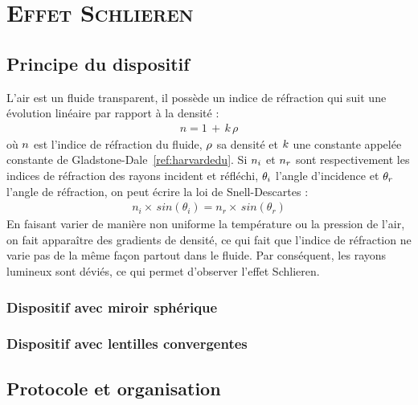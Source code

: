 \renewcommand{\chaptername}{\scshape Partie}
\chapter{\normalfont \scshape Effet Schlieren}
\section{Principe du dispositif}
L'air est un fluide transparent, il possède un indice de réfraction qui suit une évolution linéaire par rapport à la densité :
\begin{align}
	n = 1\,+\,k\,\rho
\end{align}
où $\mathnormal{n}$ est l'indice de réfraction du fluide, $\mathnormal{\rho}$ sa densité et $\mathnormal{k}$ une constante appelée constante de Gladstone-Dale~\ref{ref:harvardedu}. Si $\mathnormal{n_i}$ et $\mathnormal{n_r}$ sont respectivement les indices de réfraction des rayons incident et réfléchi, $\mathnormal{\theta_i}$ l'angle d'incidence et $\mathnormal{\theta_r}$ l'angle de réfraction, on peut écrire la loi de Snell-Descartes :
\begin{align}
	n_i\times\,sin(\theta_i) = n_r\times\,sin(\theta_r) 
\end{align}
En faisant varier de manière non uniforme la température ou la pression de l'air, on fait apparaître des gradients de densité, ce qui fait que l'indice de réfraction ne varie pas de la même façon partout dans le fluide. Par conséquent, les rayons lumineux sont déviés, ce qui permet d'observer l'effet Schlieren.
\subsection{Dispositif avec miroir sphérique}
\subsection{Dispositif avec lentilles convergentes}
\section{Protocole et organisation}
